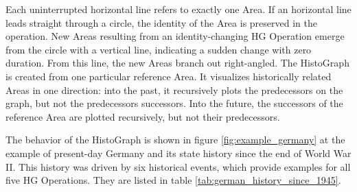 \vspace{-1em}

Each uninterrupted horizontal line refers to exactly one Area. If an horizontal line leads straight through a circle, the identity of the Area is preserved in the operation. New Areas resulting from an identity-changing HG Operation emerge from the circle with a vertical line, indicating a sudden change with zero duration. From this line, the new Areas branch out right-angled. The HistoGraph is created from one particular reference Area. It visualizes historically related Areas in one direction: into the past, it recursively plots the predecessors on the graph, but not the predecessors successors. Into the future, the successors of the reference Area are plotted recursively, but not their predecessors.

The behavior of the HistoGraph is shown in figure \ref{fig:example_germany} at the example of present-day Germany and its state history since the end of World War II. This history was driven by six historical events, which provide examples for all five HG Operations. They are listed in table \ref{tab:german_history_since_1945}.

